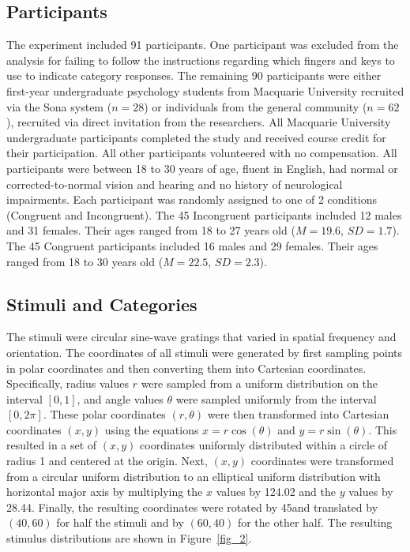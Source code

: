 \documentclass[doc, floatsintext]{apa7}
\begin{document}
\subsection{Participants}
The experiment included 91 participants.   One participant was excluded from the analysis for failing to
follow the instructions regarding which fingers and keys to
use to indicate category responses. The remaining 90
participants were either first-year undergraduate psychology
students from Macquarie University recruited via the Sona
system ($n = 28$) or individuals from the general community
($n = 62$), recruited via direct invitation from the
researchers. All Macquarie University undergraduate
participants completed the study and received course credit
for their participation.  All other participants volunteered
with no compensation. All participants were between 18 to 30
years of age, fluent in English, had normal or
corrected-to-normal vision and hearing and no history of
neurological impairments. Each participant was randomly
assigned to one of 2 conditions (Congruent and
Incongruent).  The 45 Incongruent participants included 12 males and 31 females. Their ages ranged from 18 to 27
years old ($M = 19.6$, $SD = 1.7$).  The 45 Congruent participants included 16 males and 29 females. Their ages
ranged from 18 to 30 years old ($M = 22.5$, $SD = 2.3$).  

\subsection{Stimuli and Categories}
The stimuli were circular sine-wave gratings that varied in
spatial frequency and orientation.  The coordinates of all stimuli were
generated by first sampling points in polar coordinates and
then converting them into Cartesian coordinates.
Specifically, radius values $r$ were sampled from a
uniform distribution on the interval $[0, 1]$, and angle
values $\theta$ were sampled uniformly from the interval $[0, 2\pi]$.
These polar coordinates $(r, \theta)$ were then transformed
into Cartesian coordinates $(x, y)$ using the equations $x =
r \cos(\theta)$ and $y = r\sin(\theta)$. This resulted in a
set of $(x, y)$ coordinates uniformly distributed within a
circle of radius 1 and centered at the origin. Next, $(x,y)$ coordinates were transformed from a circular uniform
distribution to an elliptical uniform distribution with horizontal major axis by multiplying the $x$ values by 124.02 and the $y$ values by 28.44. Finally, the
resulting coordinates were rotated by 45\degree and
translated by $(40, 60)$ for half the stimuli and by $(60,
40)$ for the other half. The resulting stimulus distributions
are shown in Figure~\ref{fig_2}.
\end{document}
